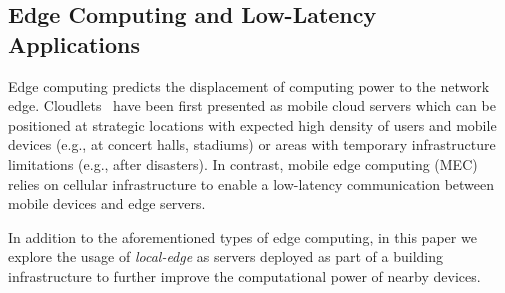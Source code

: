 

\subsection{Edge Computing and Low-Latency Applications}

Edge computing predicts the displacement of computing power to the network edge. Cloudlets~\cite{CLOUDLETS} have been first presented as mobile cloud servers which can be positioned at strategic locations with expected high density of users and mobile devices (e.g., at concert halls, stadiums) or areas with temporary infrastructure limitations (e.g., after disasters). In contrast, mobile edge computing (MEC)~\cite{MEC} relies on cellular infrastructure to enable a low-latency communication between mobile devices and edge servers. 

In addition to the aforementioned types of edge computing, in this paper we explore the usage of \textit{local-edge} as servers deployed as part of a building infrastructure to further improve the computational power of nearby devices. 